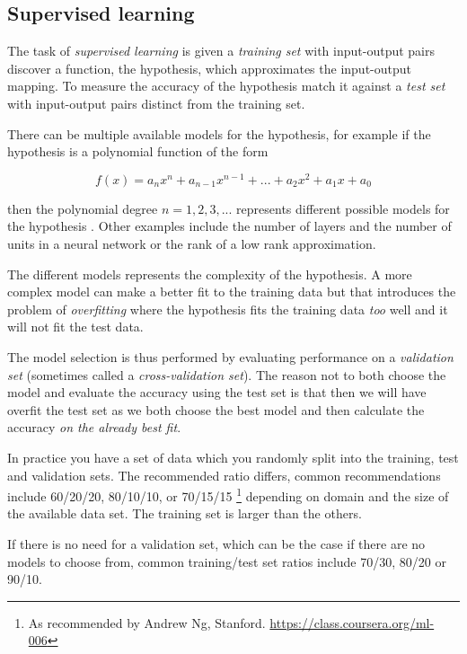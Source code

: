 
\subsection{Supervised learning}

The task of \textit{supervised learning} is given a \textit{training set} with input-output pairs discover a function, the hypothesis, which approximates the input-output mapping.  To measure the accuracy of the hypothesis match it against a \textit{test set} with input-output pairs distinct from the training set.
\citep{norvigAI}

There can be multiple available models for the hypothesis, for example if the hypothesis is a polynomial function of the form 

\begin{equation}
f(x) = a_n x^n + a_{n - 1} x^{n - 1} + ... + a_2 x^2 + a_1 x + a_0
\end{equation}

then the polynomial degree $n = 1, 2, 3, ...$ represents different possible models for the hypothesis \citep{norvigAI}. Other examples include the number of layers and the number of units in a neural network or the rank of a low rank approximation.

The different models represents the complexity of the hypothesis. A more complex model can make a better fit to the training data but that introduces the problem of \textit{overfitting} where the hypothesis fits the training data \textit{too} well and it will not fit the test data.
\citep{norvigAI}

The model selection is thus performed by evaluating performance on a \textit{validation set} (sometimes called a \textit{cross-validation set}). The reason not to both choose the model and evaluate the accuracy using the test set is that then we will have overfit the test set as we both choose the best model and then calculate the accuracy \textit{on the already best fit}.
\citep{norvigAI}

In practice you have a set of data which you randomly split into the training, test and validation sets. The recommended ratio differs, common recommendations include 60/20/20, 80/10/10, or 70/15/15 \footnote{As recommended by Andrew Ng, Stanford. \url{https://class.coursera.org/ml-006}} depending on domain and the size of the available data set. The training set is larger than the others.

If there is no need for a validation set, which can be the case if there are no models to choose from, common training/test set ratios include 70/30, 80/20 \cite{hu2008collaborative} or 90/10.


